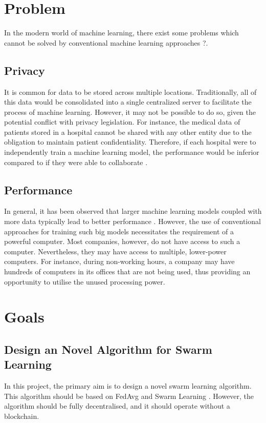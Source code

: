 \section{Problem}
In the modern world of machine learning, there exist some problems which cannot be solved by conventional machine learning approaches \citeme?.

\subsection{Privacy}
It is common for data to be stored across multiple locations. Traditionally, all of this data would be consolidated into a single centralized server to facilitate the process of machine learning. However, it may not be possible to do so, given the potential conflict with privacy legislation. For instance, the medical data of patients stored in a hospital cannot be shared with any other entity due to the obligation to maintain patient confidentiality. Therefore, if each hospital were to independently train a machine learning model, the performance would be inferior compared to if they were able to collaborate \citeme.

\subsection{Performance}
In general, it has been observed that larger machine learning models coupled with more data typically lead to better performance \citeme. However, the use of conventional approaches for training such big models necessitates the requirement of a powerful computer. Most companies, however, do not have access to such a computer. Nevertheless, they may have access to multiple, lower-power computers. For instance, during non-working hours, a company may have hundreds of computers in its offices that are not being used, thus providing an opportunity to utilise the unused processing power.

\section{Goals}

\subsection{Design an Novel Algorithm for Swarm Learning}
In this project, the primary aim is to design a novel swarm learning algorithm. This algorithm should be based on FedAvg \citeme and Swarm Learning \citeme. However, the algorithm should be fully decentralised, and it should operate without a blockchain.

